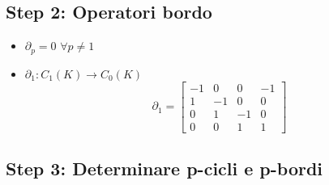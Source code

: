 \documentclass[a4paper]{report}
\newcommand{\ra}{\ensuremath{\rightarrow}}
\begin{document}
\subsection{Step 2: Operatori bordo}
\begin{itemize}
    \item $\partial_p=0$ $\forall p\neq 1$
    \item $\partial_1:C_1(K)\ra C_0(K)$
          \[
              \partial_1=\left[\begin{array}{rrrr}
                      -1 & 0  & 0  & -1 \\
                      1  & -1 & 0  & 0  \\
                      0  & 1  & -1 & 0  \\
                      0  & 0  & 1  & 1
                  \end{array}\right]
          \]
\end{itemize}
\subsection{Step 3: Determinare p-cicli e p-bordi}
\end{document}
